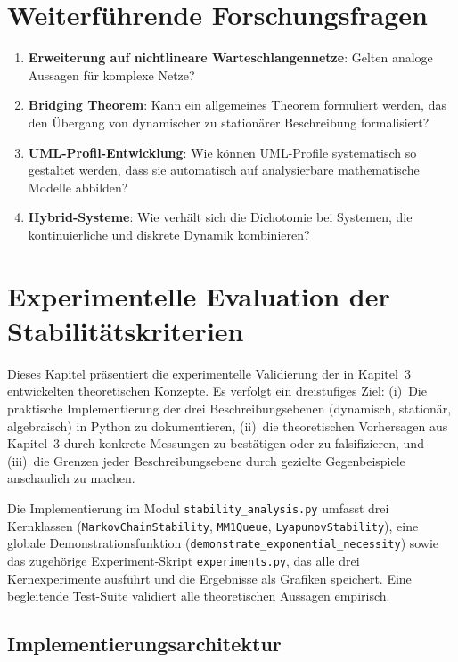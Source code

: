 ﻿\documentclass[a4paper,12pt]{report}
\theoremstyle{definition}
\begin{document}
\section{Weiterführende Forschungsfragen}

\begin{enumerate}
	\item[-] \textbf{Erweiterung auf nichtlineare Warteschlangennetze}: Gelten analoge Aussagen für komplexe Netze?
	
	\item[-] \textbf{Bridging Theorem}: Kann ein allgemeines Theorem formuliert werden, das den Übergang von dynamischer zu stationärer Beschreibung formalisiert?
	
	\item[-] \textbf{UML-Profil-Entwicklung}: Wie können UML-Profile systematisch so gestaltet werden, dass sie automatisch auf analysierbare mathematische Modelle abbilden?
	
	\item[-] \textbf{Hybrid-Systeme}: Wie verhält sich die Dichotomie bei Systemen, die kontinuierliche und diskrete Dynamik kombinieren?
\end{enumerate}

\section{Experimentelle Evaluation der Stabilitätskriterien}
\label{sec:experimente}

Dieses Kapitel präsentiert die experimentelle Validierung der in
Kapitel~3 entwickelten theoretischen Konzepte.  Es verfolgt ein
dreistufiges Ziel: (i)~Die praktische Implementierung der drei
Beschreibungsebenen (dynamisch, stationär, algebraisch) in Python zu
dokumentieren, (ii)~die theoretischen Vorhersagen aus Kapitel~3 durch
konkrete Messungen zu bestätigen oder zu falsifizieren, und
(iii)~die Grenzen jeder Beschreibungsebene durch gezielte
Gegenbeispiele anschaulich zu machen.

Die Implementierung im Modul \texttt{stability\_analysis.py} umfasst
drei Kernklassen (\texttt{MarkovChainStability}, \texttt{MM1Queue},
\texttt{LyapunovStability}), eine globale Demonstrationsfunktion
(\texttt{demonstrate\_exponential\_necessity}) sowie das zugehörige
Experiment-Skript \texttt{experiments.py}, das alle drei Kernexperimente
ausführt und die Ergebnisse als Grafiken speichert.  Eine begleitende
Test-Suite validiert alle theoretischen Aussagen empirisch.

\subsection{Implementierungsarchitektur}
\label{subsec:architektur}
\end{document}
